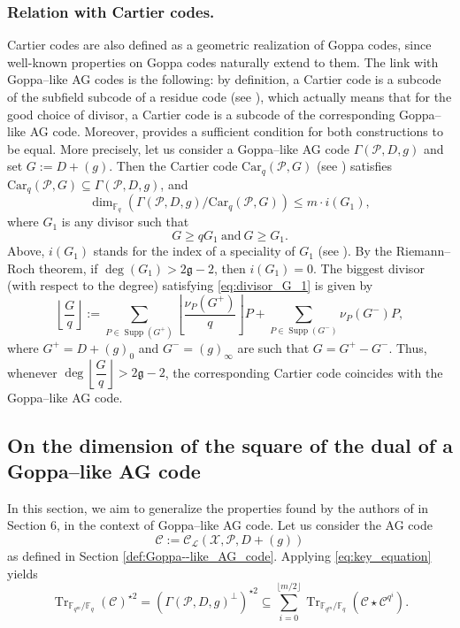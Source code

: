\documentclass[a4paper]{article}
\theoremstyle{definition}
\theoremstyle{remark}
\newcommand{\calP}{\mathcal{P}}
\newcommand{\calL}{\mathcal{L}}
\newcommand{\calC}{\mathcal{C}}
\newcommand{\calX}{\mathcal{X}}
\newcommand{\fq}{\mathbb{F}_{q}}
\newcommand{\Tr}[1]{\operatorname{Tr}_{\mathbb{F}_{q^m}/\fq}\left(#1\right)}
\newcommand{\Supp}{\operatorname{Supp}}
\begin{document}
\subsubsection{Relation with Cartier codes.} Cartier codes \cite{Cou14} are also defined as a geometric realization of Goppa codes, since well-known properties on Goppa codes naturally extend to them.
The link with Goppa--like AG codes is the following: by definition, a Cartier code is a subcode of the subfield subcode of a residue code (see \cite[Proposition 4.3]{Cou14}), which actually means that for the good choice of divisor, a Cartier code is a subcode of the corresponding Goppa--like AG code. Moreover, \cite[Theorem 5.1]{Cou14} provides a sufficient condition for both constructions to be equal. More precisely, let us consider a Goppa--like AG code $\Gamma(\calP,D,g)$  and set $G := D+(g)$. Then the Cartier code $\mathrm{Car}_q(\calP,G)$ (see \cite[Definition 4.2]{Cou14}) satisfies $\mathrm{Car}_q(\calP,G) \subseteq \Gamma(\calP,D,g)$, and 
$$ \dim_{\fq} \left( \Gamma(\calP,D,g)/ \mathrm{Car}_q(\calP,G)\right) \leq m \cdot i(G_1),$$
where $G_1$ is any divisor such that 
\begin{equation} \label{eq:divisor_G_1}
G \geq qG_1 \ \mathrm{and} \ G \geq G_1.
\end{equation}
 Above, $i(G_1)$ stands for the index of a speciality of $G_1$ (see \cite[Definition~1.6.10]{Sti09}). By the Riemann--Roch theorem, if $\deg(G_1) > 2\mathfrak{g}-2$, then $i(G_1) =0.$ The biggest divisor (with respect to the degree) satisfying \eqref{eq:divisor_G_1} is given by 
\begin{equation}\label{eq:G/q}
\left\lfloor \frac{G}{q} \right\rfloor := \sum\limits_{P \in \Supp(G^+)} \left\lfloor\frac{\nu_P(G^+)}{q}\right\rfloor P + \sum\limits_{P \in \Supp(G^-)}\nu_P(G^-)P,
\end{equation}
 where $G^+ = D+(g)_0$ and $G^-=(g)_\infty$ are such that $G=G^+-G^-$.
Thus, whenever $\deg\left\lfloor \dfrac{G}{q} \right\rfloor > 2\mathfrak{g}-2$, the corresponding Cartier code coincides with the Goppa--like AG code. 

\subsection{On the dimension of the square of the dual of a Goppa--like AG code} \label{section:1st_improvement}
In this section, we aim to generalize the properties found by the authors of \cite{MT21} in Section 6, in the context of Goppa--like AG code. Let us consider the AG code 
$$\calC := \calC_{\calL}(\calX,\calP,D+(g))$$
as defined in Section \ref{def:Goppa--like_AG_code}. Applying \eqref{eq:key_equation} yields   
\begin{equation} \label{eq:key_equation_Goppa--like} 
\Tr{\calC}^{\star 2} = (\Gamma(\calP,D,g)^{\perp})^{\star2} \subseteq \sum\limits_{i=0}^{\lfloor{m/2} \rfloor} \Tr{\calC\star \calC^{q^i}}.
\end{equation}
\end{document}
